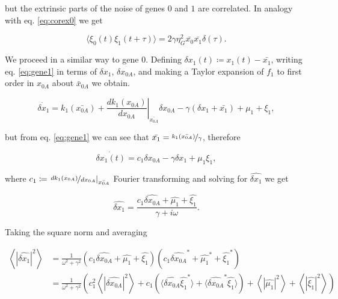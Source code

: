 but the extrinsic parts of the noise of genes $0$ and $1$ are correlated. In analogy with eq. \eqref{eq:corex0} we get

\begin{equation}
  \langle\xi_0(t)\xi_1(t+\tau)\rangle = 2\gamma\eta_G^2\bar{x_0}\bar{x_1}\delta(\tau).
\end{equation}


We proceed in a similar way to gene $0$. Defining $\delta x_1(t) \coloneqq x_1(t) - \bar{x_1}$, writing eq. \eqref{eq:gene1} in terms of $\delta x_1$, $\delta x_{0A}$, and making a Taylor expansion of $f_1$ to first order in $x_{0A}$ about $\bar{x}_{0A}$ we obtain.

\begin{equation}
\dot{\delta x_1} = k_1(\bar{x_{0A}}) + \left.\frac{dk_1(x_{0A})}{dx_{0A}}\right|_{\bar{x_{0A}}}\delta x_{0A} - \gamma(\delta x_1 + \bar{x_1}) + \mu_1 + \xi_1,
\end{equation}

but from eq. \eqref{eq:gene1} we can see that $\bar{x_1} = \nicefrac{k_1(\bar{x_{0A}})}{\gamma}$, therefore

\begin{equation}
  \label{eq:dgene1}
  \dot{\delta{x_1}(t)}=c_1\delta x_{0A}-\gamma\delta x_1 + \mu_1 \xi_1,
\end{equation}

where $c_1 \coloneqq \left.\nicefrac{dk_1(x_{0A})}{dx_{0A}}\right|_{\bar{x_{0A}}}$ Fourier transforming and solving for $\hat{\delta x_1}$ we get

\begin{equation*}
  \hat{\delta x_1}=\frac{c_1\hat{\delta x_{0A}}+\hat{\mu_1}+\hat{\xi_1}}{\gamma + i\omega}.
\end{equation*}

Taking the square norm and averaging

\begin{equation*}
  \label{eq:pgene1}
  \begin{split}
    \left\langle|\hat{\delta x_1}|^2\right\rangle &= \frac{1}{\omega^2+\gamma^2}\left(c_1\hat{\delta x_{0A}} + \hat{\mu_1} + \hat{\xi_1}\right)\left(c_1\hat{\delta x_{0A}}^* + \hat{\mu_1}^* + \hat{\xi_1}^*\right)\\
    &=\frac{1}{\omega^2+\gamma^2}\left(c_1^2 \left\langle|\hat{\delta x_{0A}}|^2\right\rangle + c_1\left(\langle\hat{\delta x_{0A}}\hat{\xi_1}^*\rangle+\langle\hat{\delta x_{0A}}^*\hat{\xi_1}\rangle\right) +  \left\langle|\hat{\mu_1}|^2\right\rangle +  \left\langle|\hat{\xi_1}|^2\right\rangle\right)
  \end{split}
\end{equation*}

